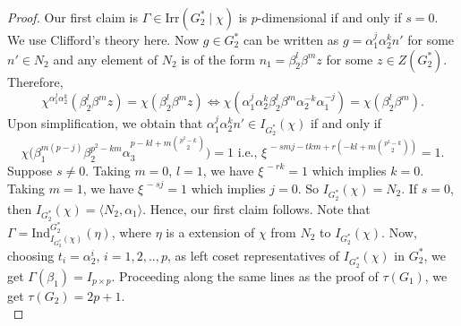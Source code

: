 \documentclass[a4paper,11pt]{amsart}
\numberwithin{equation}{section}
\numberwithin{equation}{subsection}
\begin{document}
\begin{proof}
Our first claim is $\Gamma\in \mathrm{Irr}(G_2^*\mid \chi)$ is $p$-dimensional if and only if $s=0$.
We use Clifford's theory here. Now $g \in G_2^*$ can be written as $g =  \alpha_1^j \alpha_2^k n'$
for some $n' \in N_2$ and any element of $N_2$ is of the form $n_1 = \beta_2^l \beta^m z$
for some $z \in Z(G_2^*)$.
Therefore,
\[
\chi^{\alpha_1^j \alpha_2^k}(\beta_2^l \beta^m z)
= \chi(\beta_2^l \beta^m z)
\iff
\chi(\alpha_1^j \alpha_2^k \beta_2^l \beta^m  \alpha_2^{-k} \alpha_1^{-j}) = \chi(\beta_2^l \beta^m).\]
Upon simplification, we obtain that
$\alpha_1^j \alpha_2^k n' \in I_{G_2^*}(\chi)$
if and only if
\[
\chi\big(\beta_1^{m(p-j)} \beta_2^{p^2-km} \alpha_3^{p-kl+m\binom{p^2-k}{2}}\big) = 1 \text{ i.e., } \xi^{\,-smj-tkm+r(-kl+m\binom{p^2-k}{2})} = 1.
\] 
Suppose $s \neq 0$. Taking $m=0$, $l=1$, we have $\xi^{\,-rk} = 1$ which implies $k= 0$. Taking $m=1$, we have $\xi^{\,-sj} = 1$ which implies $j=0$. So $I_{{G}_2^*}(\chi)= N_2$. 
If $s= 0$, then $I_{{G}_2^*}(\chi)= \langle N_2, \alpha_1 \rangle$. 
Hence, our first claim follows.
Note that $\Gamma= \mathrm{Ind}_{I_{{G}_2^*}(\chi)}^{G_2^*}(\eta)$, where $\eta$ is a extension of $\chi$ from $N_2$ to $I_{{G}_2^*}(\chi)$.
Now, choosing $t_i= \alpha_2^i$, $i=1,2,..,p$, as left coset representatives of $I_{{G}_2^*}(\chi)$ in ${G}_2^*$, we get $\Gamma(\beta_1)= I_{p \times p}$. 
Proceeding along the same lines as the proof of $\tau(G_1)$, we get $\tau(G_2)= 2p+1$. \\



\end{proof}
\end{document}
